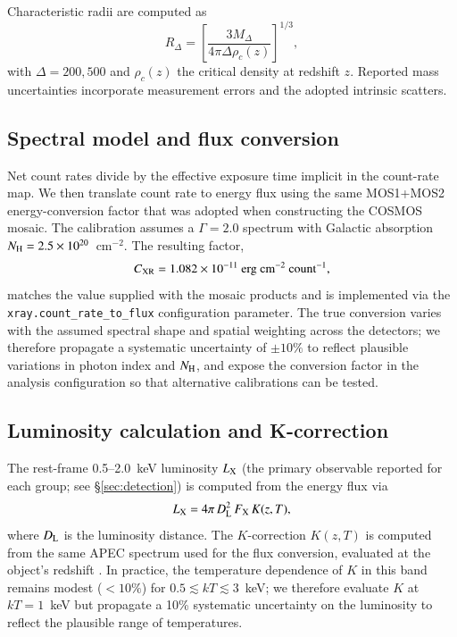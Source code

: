 \documentclass{aa}
\begin{document}
Characteristic radii are computed as
\begin{equation}
R_{\Delta} = \left[\frac{3 M_{\Delta}}{4\pi \Delta \rho_c(z)}\right]^{1/3},
\label{eq:RDelta}
\end{equation}
with $\Delta = 200, 500$ and $\rho_c(z)$ the critical density at redshift $z$. Reported mass uncertainties incorporate measurement errors and the adopted intrinsic scatters.

\subsection{Spectral model and flux conversion}
\label{sec:flux}

Net count rates divide by the effective exposure time implicit in the count-rate map. We then translate count rate to energy flux using the same MOS1+MOS2 energy-conversion factor that was adopted when constructing the COSMOS mosaic. The calibration assumes a $\Gamma = 2.0$ spectrum with Galactic absorption $N_{\rm H} = 2.5 \times 10^{20}$~cm$^{-2}$. The resulting factor,
\begin{equation}
C_{\rm XR} = 1.082 \times 10^{-11}~\mathrm{erg~cm^{-2}~count^{-1}},
\label{eq:CXR}
\end{equation}
matches the value supplied with the mosaic products and is implemented via the \texttt{xray.count\_rate\_to\_flux} configuration parameter. The true conversion varies with the assumed spectral shape and spatial weighting across the detectors; we therefore propagate a systematic uncertainty of $\pm10\%$ to reflect plausible variations in photon index and $N_{\rm H}$, and expose the conversion factor in the analysis configuration so that alternative calibrations can be tested.

\subsection{Luminosity calculation and K-correction}
\label{sec:kcorr}

The rest-frame 0.5--2.0~keV luminosity $L_{\rm X}$ (the primary observable reported for each group; see \S\ref{sec:detection}) is computed from the energy flux via
\begin{equation}
L_{\rm X} = 4\pi\, D_{\rm L}^2\, F_{\rm X}\, K(z, T),
\label{eq:LX}
\end{equation}
where $D_{\rm L}$ is the luminosity distance. The $K$-correction $K(z, T)$ is computed from the same APEC spectrum used for the flux conversion, evaluated at the object's redshift \citep{Finoguenov2007,Leauthaud2010}. In practice, the temperature dependence of $K$ in this band remains modest ($< 10\%$) for $0.5 \lesssim kT \lesssim 3$~keV; we therefore evaluate $K$ at $kT = 1$~keV but propagate a 10\% systematic uncertainty on the luminosity to reflect the plausible range of temperatures.
\end{document}
